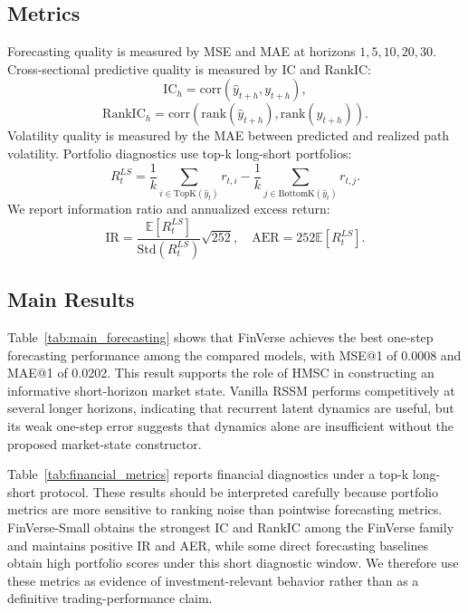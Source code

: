 \documentclass[letterpaper]{article}
\begin{document}
\subsection{Metrics}
Forecasting quality is measured by MSE and MAE at horizons $1,5,10,20,30$. Cross-sectional predictive quality is measured by IC and RankIC:
\begin{equation}
    \mathrm{IC}_h = \mathrm{corr}(\hat{y}_{t+h}, y_{t+h}),
\end{equation}
\begin{equation}
    \mathrm{RankIC}_h = \mathrm{corr}(\mathrm{rank}(\hat{y}_{t+h}), \mathrm{rank}(y_{t+h})).
\end{equation}
Volatility quality is measured by the MAE between predicted and realized path volatility. Portfolio diagnostics use top-k long-short portfolios:
\begin{equation}
    R_t^{LS} = \frac{1}{k}\sum_{i \in \mathrm{TopK}(\hat{y}_t)} r_{t,i}
    - \frac{1}{k}\sum_{j \in \mathrm{BottomK}(\hat{y}_t)} r_{t,j}.
\end{equation}
We report information ratio and annualized excess return:
\begin{equation}
    \mathrm{IR} = \frac{\mathbb{E}[R_t^{LS}]}{\mathrm{Std}(R_t^{LS})}\sqrt{252},
    \quad
    \mathrm{AER}=252\mathbb{E}[R_t^{LS}].
\end{equation}





\subsection{Main Results}
Table~\ref{tab:main_forecasting} shows that FinVerse achieves the best one-step forecasting performance among the compared models, with MSE@1 of 0.0008 and MAE@1 of 0.0202. This result supports the role of HMSC in constructing an informative short-horizon market state. Vanilla RSSM performs competitively at several longer horizons, indicating that recurrent latent dynamics are useful, but its weak one-step error suggests that dynamics alone are insufficient without the proposed market-state constructor.

Table~\ref{tab:financial_metrics} reports financial diagnostics under a top-k long-short protocol. These results should be interpreted carefully because portfolio metrics are more sensitive to ranking noise than pointwise forecasting metrics. FinVerse-Small obtains the strongest IC and RankIC among the FinVerse family and maintains positive IR and AER, while some direct forecasting baselines obtain high portfolio scores under this short diagnostic window. We therefore use these metrics as evidence of investment-relevant behavior rather than as a definitive trading-performance claim.
\end{document}
